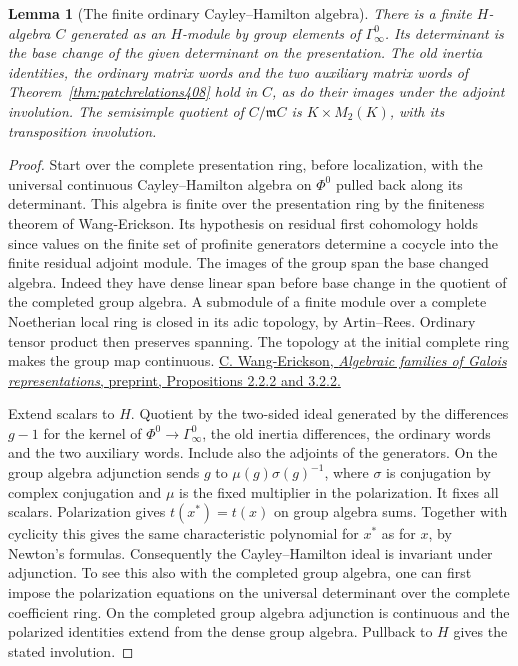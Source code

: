 \documentclass[a4paper,11pt]{article}
\newtheorem{lemma}[proposition]{Lemma}
\theoremstyle{definition}
\theoremstyle{remark}
\numberwithin{equation}{section}
\begin{document}
\begin{lemma}[The finite ordinary Cayley--Hamilton algebra]\leavevmode
\label{lem:finitech410}
There is a finite \(H\)-algebra \(C\) generated as an
\(H\)-module by group elements of \(\Gamma_\infty^0\).
Its determinant is the base change of the given determinant
on the presentation. The old inertia identities, the ordinary
matrix words and the two auxiliary matrix words of
Theorem~\ref{thm:patchrelations408} hold in \(C\), as do
their images under the adjoint involution. The semisimple
quotient of \(C/\mathfrak m C\) is
\(K\times M_2(K)\), with its transposition involution.
\end{lemma}
\begin{proof}
Start over the complete presentation ring, before localization,
with the universal continuous Cayley--Hamilton algebra on
\(\Phi^0\) pulled back along its determinant. This algebra is
finite over the presentation ring by the finiteness theorem
of Wang-Erickson. Its hypothesis on residual first cohomology
holds since values on the finite set of profinite generators
determine a cocycle into the finite residual adjoint module.
The images of the group span the base changed algebra.
Indeed they have dense linear span before base change in
the quotient of the completed group algebra. A submodule
of a finite module over a complete Noetherian local ring
is closed in its adic topology, by Artin--Rees. Ordinary
tensor product then preserves spanning. The topology at the
initial complete ring makes the group map continuous.
\href{https://people.brandeis.edu/~cwe/pdfs/algfam.pdf}
{C. Wang-Erickson, \emph{Algebraic families of Galois representations},
preprint, Propositions 2.2.2 and 3.2.2.}

Extend scalars to \(H\). Quotient by the two-sided ideal
generated by the differences \(g-1\) for the kernel of
\(\Phi^0\to\Gamma_\infty^0\), the old inertia differences,
the ordinary words and the two auxiliary words. Include also
the adjoints of the generators. On the group algebra adjunction
sends \(g\) to \(\mu(g)\sigma(g)^{-1}\), where \(\sigma\)
is conjugation by complex conjugation and \(\mu\) is the
fixed multiplier in the polarization. It fixes all scalars.
Polarization gives \(t(x^*)=t(x)\) on group algebra sums.
Together with cyclicity this gives the same characteristic
polynomial for \(x^*\) as for \(x\), by Newton's formulas.
Consequently the Cayley--Hamilton ideal is invariant under
adjunction. To see this also with the completed group algebra,
one can first impose the polarization equations on the
universal determinant over the complete coefficient ring.
On the completed group algebra adjunction is continuous
and the polarized identities extend from the dense group
algebra. Pullback to \(H\) gives the stated involution.


\end{proof}
\end{document}
